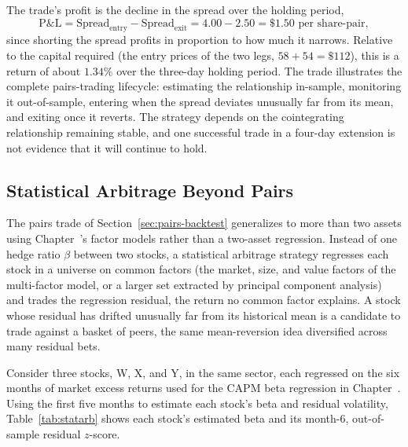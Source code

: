 \documentclass[../ai_in_finance]{subfiles}
\begin{document}
The trade's profit is the decline in the spread over the holding period,
\begin{equation*}
\text{P\&L} = \text{Spread}_{\text{entry}} - \text{Spread}_{\text{exit}} = 4.00 - 2.50 = \$1.50 \text{ per share-pair},
\end{equation*}
since shorting the spread profits in proportion to how much it narrows. Relative to the capital required (the entry prices of the two legs, $58+54=\$112$), this is a return of about $1.34\%$ over the three-day holding period. The trade illustrates the complete pairs-trading lifecycle: estimating the relationship in-sample, monitoring it out-of-sample, entering when the spread deviates unusually far from its mean, and exiting once it reverts. The strategy depends on the cointegrating relationship remaining stable, and one successful trade in a four-day extension is not evidence that it will continue to hold.

\subsection{Statistical Arbitrage Beyond Pairs}
\label{sec:stat-arb}

The pairs trade of Section~\ref{sec:pairs-backtest} generalizes to more than two assets using Chapter~'s factor models rather than a two-asset regression. Instead of one hedge ratio $\beta$ between two stocks, a statistical arbitrage strategy regresses each stock in a universe on common factors (the market, size, and value factors of the multi-factor model, or a larger set extracted by principal component analysis) and trades the regression residual, the return no common factor explains. A stock whose residual has drifted unusually far from its historical mean is a candidate to trade against a basket of peers, the same mean-reversion idea diversified across many residual bets.

Consider three stocks, W, X, and Y, in the same sector, each regressed on the six months of market excess returns used for the CAPM beta regression in Chapter~. Using the first five months to estimate each stock's beta and residual volatility, Table~\ref{tab:statarb} shows each stock's estimated beta and its month-6, out-of-sample residual $z$-score.
\end{document}
